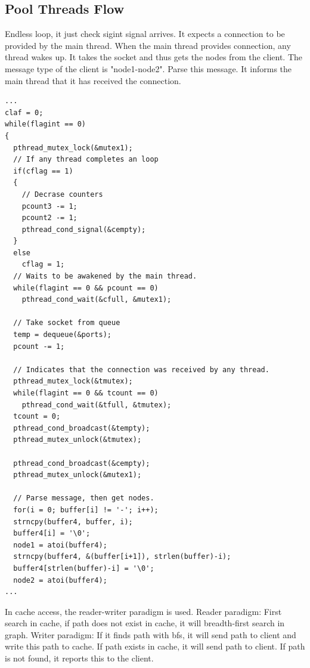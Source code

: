\documentclass{article}
\begin{document}
\subsection{Pool Threads Flow}
\noindent Endless loop, it just check sigint signal arrives. It expects a connection to be provided by the main thread. When the main thread provides connection, any thread wakes up. It takes the socket and thus gets the nodes from the client. The message type of the client is "node1-node2". Parse this message. It informs the main thread that it has received the connection.
\begin{lstlisting}[style=CStyle]
...
claf = 0;
while(flagint == 0)
{
  pthread_mutex_lock(&mutex1);
  // If any thread completes an loop
  if(cflag == 1)
  {
    // Decrase counters
    pcount3 -= 1;
    pcount2 -= 1;
    pthread_cond_signal(&cempty);
  }
  else
    cflag = 1;
  // Waits to be awakened by the main thread.
  while(flagint == 0 && pcount == 0)
    pthread_cond_wait(&cfull, &mutex1);
  
  // Take socket from queue
  temp = dequeue(&ports);
  pcount -= 1;
  
  // Indicates that the connection was received by any thread.
  pthread_mutex_lock(&tmutex);
  while(flagint == 0 && tcount == 0)
    pthread_cond_wait(&tfull, &tmutex);
  tcount = 0;
  pthread_cond_broadcast(&tempty);
  pthread_mutex_unlock(&tmutex);

  pthread_cond_broadcast(&cempty);
  pthread_mutex_unlock(&mutex1);

  // Parse message, then get nodes.
  for(i = 0; buffer[i] != '-'; i++);
  strncpy(buffer4, buffer, i);
  buffer4[i] = '\0';
  node1 = atoi(buffer4);
  strncpy(buffer4, &(buffer[i+1]), strlen(buffer)-i);
  buffer4[strlen(buffer)-i] = '\0';
  node2 = atoi(buffer4);
...
\end{lstlisting}
\noindent In cache access, the reader-writer paradigm is used. Reader paradigm: First search in cache, if path does not exist in cache, it will breadth-first search in graph. Writer paradigm: If it finds path with bfs, it will send path to client and write this path to cache. If path exists in cache, it will send path to client. If path is not found, it reports this to the client.
\end{document}
